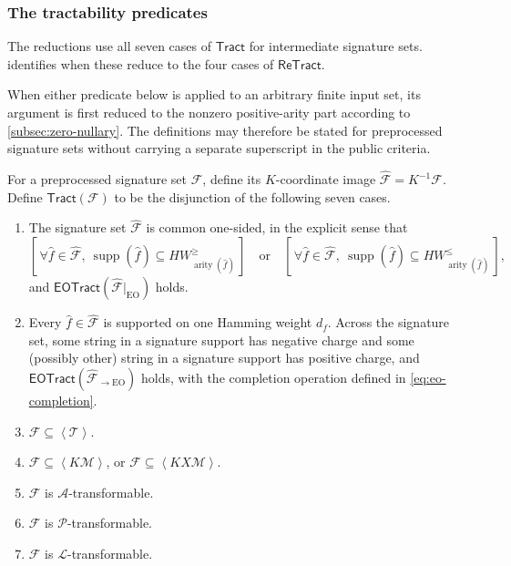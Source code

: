\documentclass[11pt,letterpaper,onecolumn]{article}
\theoremstyle{plain}
\theoremstyle{definition}
\theoremstyle{remark}
\newcommand{\cF}{\mathcal F}
\newcommand{\cA}{\mathscr A}
\newcommand{\cP}{\mathscr P}
\newcommand{\cL}{\mathscr L}
\newcommand{\cM}{\mathscr M}
\newcommand{\cT}{\mathscr T}
\newcommand{\angles}[1]{\left\langle #1\right\rangle}
\newcommand{\EOTract}{\mathsf{EOTract}}
\newcommand{\Tract}{\mathsf{Tract}}
\newcommand{\ReTract}{\mathsf{ReTract}}
\newcommand{\supp}{\operatorname{supp}}
\newcommand{\arity}{\operatorname{arity}}
\newcommand{\EO}{\mathrm{EO}}
\begin{document}
\subsubsection{The tractability predicates}
\label{subsec:tract-predicate}

The reductions use all seven cases of \(\Tract\) for intermediate
signature sets.  identifies when these reduce
to the four cases of \(\ReTract\).

When either predicate below is applied to an arbitrary finite input set, its
argument is first reduced to the nonzero positive-arity part according to
\cref{subsec:zero-nullary}.  The definitions may therefore be stated for
preprocessed signature sets without carrying a separate superscript in the
public criteria.

For a preprocessed signature set \(\cF\), define its \(K\)-coordinate image
\(\widehat{\cF}=K^{-1}\cF\).  Define \(\Tract(\cF)\) to be the disjunction
of the following seven cases.

\begin{enumerate}[label=\textnormal{(\arabic*)}]
\item \label{case:one-sided}
      The signature set \(\widehat{\cF}\) is common one-sided, in the explicit
      sense that
      \[
       [\,\forall\widehat f\in\widehat{\cF},\
       \supp(\widehat f)\subseteq HW_{\arity(\widehat f)}^{\ge}\,]
       \quad\text{or}\quad
       [\,\forall\widehat f\in\widehat{\cF},\
       \supp(\widehat f)\subseteq HW_{\arity(\widehat f)}^{\le}\,],
      \]
      and \(\EOTract(\widehat{\cF}|_{\EO})\) holds.

\item \label{case:single-weight}
      Every \(\widehat f\in\widehat{\cF}\) is supported on one Hamming
      weight \(d_f\).  Across the signature set, some string in a signature support has negative
      charge and some (possibly other) string in a signature support has positive charge, and
      \(\EOTract(\widehat{\cF}_{\to\EO})\) holds, with the completion
      operation defined in \cref{eq:eo-completion}.

\item \label{case:arity-two}
      \(\cF\subseteq\angles{\cT}\).

\item \label{case:matching}
      \(\cF\subseteq\angles{K\cM}\), or
      \(\cF\subseteq\angles{KX\cM}\).

\item \label{case:affine}
      \(\cF\) is \(\cA\)-transformable.

\item \label{case:product}
      \(\cF\) is \(\cP\)-transformable.

\item \label{case:local-affine}
      \(\cF\) is \(\cL\)-transformable.

\end{enumerate}
\end{document}
